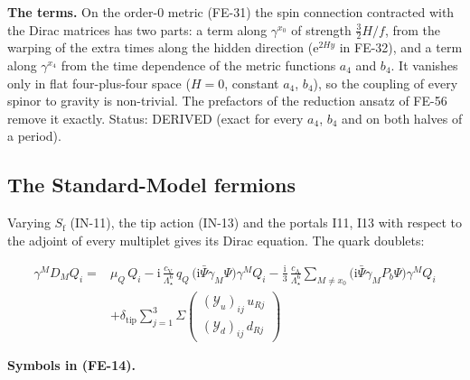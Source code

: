 \documentclass[
  10pt,
]{article}
\begin{document}
\textbf{The terms.} On the order-0 metric (FE-31) the spin connection
contracted with the Dirac matrices has two parts: a term along
\(\gamma^{x_0}\) of strength \(\frac32H/f\), from the warping of the
extra times along the hidden direction (\(\mathrm{e}^{2Hy}\) in FE-32),
and a term along \(\gamma^{x_4}\) from the time dependence of the metric
functions \(a_4\) and \(b_4\). It vanishes only in flat four-plus-four
space (\(H = 0\), constant \(a_4\), \(b_4\)), so the coupling of every
spinor to gravity is non-trivial. The prefactors of the reduction ansatz
of FE-56 remove it exactly. Status: DERIVED (exact for every \(a_4\),
\(b_4\) and on both halves of a period).

\hypertarget{the-standard-model-fermions-1}{%
\subsection{The Standard-Model
fermions}\label{the-standard-model-fermions-1}}

Varying \(S_{\mathrm{f}}\) (IN-11), the tip action (IN-13) and the
portals I11, I13 with respect to the adjoint of every multiplet gives
its Dirac equation. The quark doublets:

\[
\begin{aligned}
\gamma^MD_MQ_i ={}& \mu_Q\,Q_i -
 \mathrm{i}\,\frac{c_{\mathrm{V}}}{\Lambda_\star^6}\,q_Q\,\big(\mathrm{i}\bar\Psi\gamma_M\Psi\big)\gamma^MQ_i
 - \frac{\mathrm{i}}{3}\,\frac{c_{\mathrm{A}}}{\Lambda_\star^6}\sum_{M\ne
 x_0}\big(\mathrm{i}\bar\Psi\gamma_MP_b\Psi\big)\gamma^MQ_i\\
 &+ \delta_{\mathrm{tip}}\sum_{j=1}^{3}\Sigma\begin{pmatrix}(\mathcal{Y}_u)_{ij}\,u_{Rj}\\ (
 \mathcal{Y}_d)_{ij}\,d_{Rj}\end{pmatrix}
\end{aligned} \tag{FE-14}
\]

\textbf{Symbols in (FE-14).}
\end{document}
